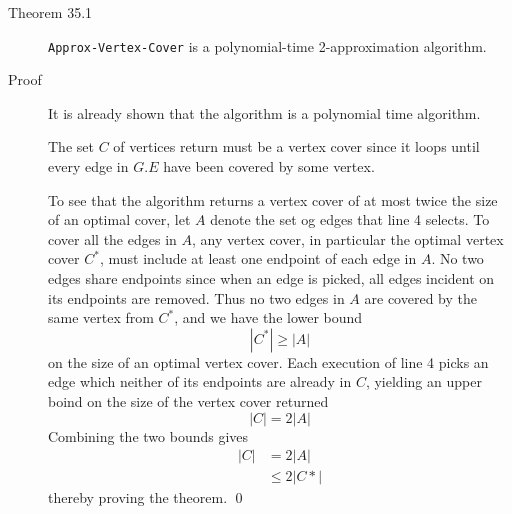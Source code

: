 
\begin{description}
\item[Theorem 35.1] \texttt{Approx-Vertex-Cover} is a polynomial-time
  2-approximation algorithm.
\item[Proof] It is already shown that the algorithm is a polynomial time
  algorithm.

  The set $C$ of vertices return must be a vertex cover since it loops until
  every edge in $G.E$ have been covered by some vertex.

  To see that the algorithm returns a vertex cover of at most twice the size of
  an optimal cover, let $A$ denote the set og edges that line 4 selects.  To
  cover all the edges in $A$, any vertex cover, in particular the optimal vertex
  cover $C^*$, must include at least one endpoint of each edge in $A$. No two
  edges share endpoints since when an edge is picked, all edges incident on its
  endpoints are removed. Thus no two edges in $A$ are covered by the same vertex
  from $C^*$, and we have the lower bound
  \[
    |C^*| \geq |A|
  \]
  on the size of an optimal vertex cover. Each execution of line 4 picks an edge
  which neither of its endpoints are already in $C$, yielding an upper boind on
  the size of the vertex cover returned
  \[
    |C| = 2|A|
  \]
  Combining the two bounds gives
  \begin{align*}
    |C| &= 2|A| \\
        &\leq 2|C*|
  \end{align*}
  thereby proving the theorem. \qed
\end{description}